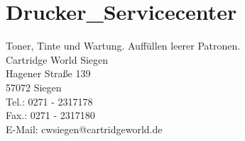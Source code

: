 \section{Drucker\_Servicecenter}
Toner, Tinte und Wartung. Auffüllen leerer Patronen.\\
Cartridge World Siegen\\
Hagener Straße 139\\
57072 Siegen\\
Tel.: 0271 - 2317178\\
Fax.: 0271 - 2317180\\
E-Mail: cwsiegen@cartridgeworld.de